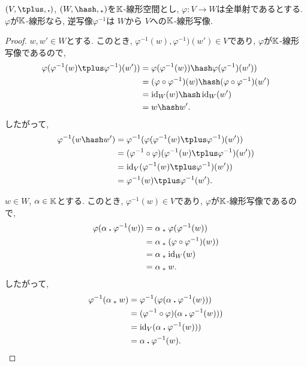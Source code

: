 \begin{example}
\label{prop:invislinear}
  $(V,\plus,\act)$, $(W,\pplus,\aact)$を$\mathbb{K}$-線形空間とし,
  $\varphi\colon V\to W$は全単射であるとする.
  $\varphi$が$\mathbb{K}$-線形なら,
  逆写像$\varphi^{-1}$は
  $W$から
  $V$への$\mathbb{K}$-線形写像.
\end{example}
\begin{proof}
$w,w'\in W$とする.
このとき,
$\varphi^{-1}(w), \varphi^{-1})(w')\in V$であり,
$\varphi$が$\mathbb{K}$-線形写像であるので,
\begin{align*}
\varphi(\varphi^{-1}(w)\plus \varphi^{-1})(w'))
&=\varphi(\varphi^{-1}(w))\pplus \varphi(\varphi^{-1})(w'))\\
&=(\varphi\circ\varphi^{-1})(w)\pplus (\varphi\circ\varphi^{-1})(w')\\
&=\id_{W}(w)\pplus \id_{W}(w')\\
&=w\pplus w'.
\end{align*}
したがって,
\begin{align*}
\varphi^{-1}(w\pplus w')
&=\varphi^{-1}(\varphi(\varphi^{-1}(w)\plus \varphi^{-1})(w'))\\
&=(\varphi^{-1}\circ\varphi)(\varphi^{-1}(w)\plus \varphi^{-1})(w'))\\
&=\id_V(\varphi^{-1}(w)\plus \varphi^{-1})(w'))\\
&=\varphi^{-1}(w)\plus \varphi^{-1}(w').
\end{align*}

$w\in W$, $\alpha\in \mathbb{K}$とする.
このとき,
$\varphi^{-1}(w)\in V$であり,
$\varphi$が$\mathbb{K}$-線形写像であるので,
\begin{align*}
\varphi(\alpha\mathbin{\boldsymbol{.}}\varphi^{-1}(w))
&=\alpha\mathbin{{}_\ast}\varphi(\varphi^{-1}(w))\\
&=\alpha\mathbin{{}_\ast}(\varphi\circ\varphi^{-1})(w))\\
&=\alpha\mathbin{{}_\ast}\operatorname{id}_W(w)\\
&=\alpha\mathbin{{}_\ast} w.
\end{align*}
したがって,
\begin{align*}
\varphi^{-1}(\alpha\mathbin{{}_\ast} w)
&=\varphi^{-1}(\varphi(\alpha\mathbin{\boldsymbol{.}}\varphi^{-1}(w)))\\
&=(\varphi^{-1}\circ\varphi)(\alpha\mathbin{\boldsymbol{.}}\varphi^{-1}(w)))\\
&=\operatorname{id}_V(\alpha\mathbin{\boldsymbol{.}}\varphi^{-1}(w)))\\
&=\alpha\mathbin{\boldsymbol{.}}\varphi^{-1}(w).
\end{align*}
\end{proof}

